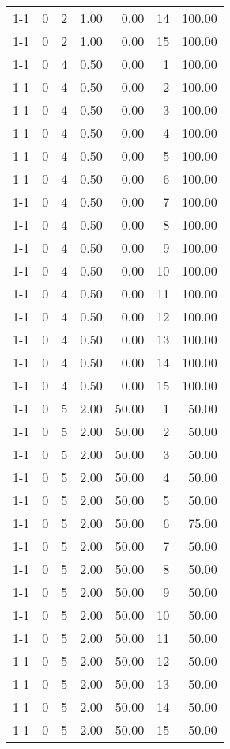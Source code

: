 \begin{tabular}{lrrrrrr}
1-1 & 0 & 2 & 1.00 & 0.00 & 14 & 100.00 \\
1-1 & 0 & 2 & 1.00 & 0.00 & 15 & 100.00 \\
1-1 & 0 & 4 & 0.50 & 0.00 & 1 & 100.00 \\
1-1 & 0 & 4 & 0.50 & 0.00 & 2 & 100.00 \\
1-1 & 0 & 4 & 0.50 & 0.00 & 3 & 100.00 \\
1-1 & 0 & 4 & 0.50 & 0.00 & 4 & 100.00 \\
1-1 & 0 & 4 & 0.50 & 0.00 & 5 & 100.00 \\
1-1 & 0 & 4 & 0.50 & 0.00 & 6 & 100.00 \\
1-1 & 0 & 4 & 0.50 & 0.00 & 7 & 100.00 \\
1-1 & 0 & 4 & 0.50 & 0.00 & 8 & 100.00 \\
1-1 & 0 & 4 & 0.50 & 0.00 & 9 & 100.00 \\
1-1 & 0 & 4 & 0.50 & 0.00 & 10 & 100.00 \\
1-1 & 0 & 4 & 0.50 & 0.00 & 11 & 100.00 \\
1-1 & 0 & 4 & 0.50 & 0.00 & 12 & 100.00 \\
1-1 & 0 & 4 & 0.50 & 0.00 & 13 & 100.00 \\
1-1 & 0 & 4 & 0.50 & 0.00 & 14 & 100.00 \\
1-1 & 0 & 4 & 0.50 & 0.00 & 15 & 100.00 \\
1-1 & 0 & 5 & 2.00 & 50.00 & 1 & 50.00 \\
1-1 & 0 & 5 & 2.00 & 50.00 & 2 & 50.00 \\
1-1 & 0 & 5 & 2.00 & 50.00 & 3 & 50.00 \\
1-1 & 0 & 5 & 2.00 & 50.00 & 4 & 50.00 \\
1-1 & 0 & 5 & 2.00 & 50.00 & 5 & 50.00 \\
1-1 & 0 & 5 & 2.00 & 50.00 & 6 & 75.00 \\
1-1 & 0 & 5 & 2.00 & 50.00 & 7 & 50.00 \\
1-1 & 0 & 5 & 2.00 & 50.00 & 8 & 50.00 \\
1-1 & 0 & 5 & 2.00 & 50.00 & 9 & 50.00 \\
1-1 & 0 & 5 & 2.00 & 50.00 & 10 & 50.00 \\
1-1 & 0 & 5 & 2.00 & 50.00 & 11 & 50.00 \\
1-1 & 0 & 5 & 2.00 & 50.00 & 12 & 50.00 \\
1-1 & 0 & 5 & 2.00 & 50.00 & 13 & 50.00 \\
1-1 & 0 & 5 & 2.00 & 50.00 & 14 & 50.00 \\
1-1 & 0 & 5 & 2.00 & 50.00 & 15 & 50.00 \\

\end{tabular}
